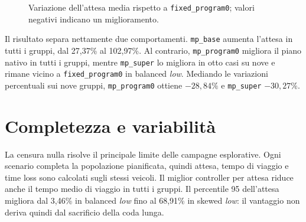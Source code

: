 \documentclass[12pt,a4paper,oneside]{report}
\numberwithin{equation}{chapter}
\begin{document}
\begin{figure}[htbp]
    \centering
    \caption{Variazione dell'attesa media rispetto a
    \texttt{fixed\_program0}; valori negativi indicano un miglioramento.}
    \label{fig:bologna-wait-bars}
\end{figure}

Il risultato separa nettamente due comportamenti. \texttt{mp\_base} aumenta
l'attesa in tutti i gruppi, dal 27,37\% al 102,97\%. Al contrario,
\texttt{mp\_program0} migliora il piano nativo in tutti i gruppi, mentre
\texttt{mp\_super} lo migliora in otto casi su nove e rimane vicino a
\texttt{fixed\_program0}
in balanced \emph{low}. Mediando le variazioni percentuali sui nove gruppi,
\texttt{mp\_program0} ottiene $-28{,}84\%$ e \texttt{mp\_super}
$-30{,}27\%$.

\section{Completezza e variabilità}

La censura nulla risolve il principale limite delle campagne esplorative.
Ogni scenario completa la popolazione pianificata, quindi attesa, tempo di
viaggio e time loss sono calcolati sugli stessi veicoli. Il miglior controller
per attesa riduce anche il tempo medio di viaggio in tutti i gruppi. Il
percentile 95 dell'attesa migliora dal 3,46\% in balanced \emph{low} fino al 68,91\%
in skewed \emph{low}: il vantaggio non deriva quindi dal sacrificio della coda lunga.
\end{document}
